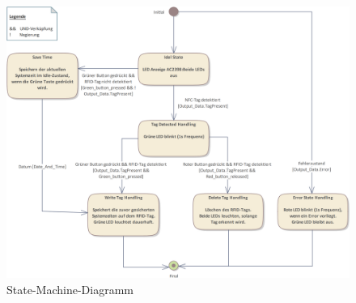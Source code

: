 \newpage
\begin{figure}[h!]
	\centering
	\includegraphics[width=1.0\textwidth]{images/StateMachine.png}
	\caption{State-Machine-Diagramm}
	\label{fig:StateMachineDiagramm}
\end{figure}
